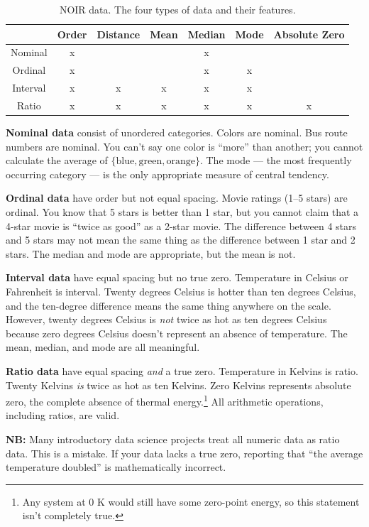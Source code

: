 \begin{table}
    \centering
    \begin{tabular}{c|cccccc}
         & Order & Distance & Mean & Median & Mode & Absolute Zero \\ \hline
        Nominal & x &  &  & x & & \\
        Ordinal & x &  &  & x & x & \\
        Interval & x & x & x & x & x & \\
        Ratio & x & x & x & x & x & x\\
    \end{tabular}
    \caption{NOIR data. The four types of data and their features.}
    \label{tab:noir}
\end{table}

\textbf{Nominal data} consist of unordered categories. Colors are nominal. Bus route numbers are nominal. You can't say one color is ``more'' than another; you cannot calculate the average of $\{\text{blue}, \text{green}, \text{orange}\}$. The mode --- the most frequently occurring category --- is the only appropriate measure of central tendency.

\textbf{Ordinal data} have order but not equal spacing. Movie ratings (1–5 stars) are ordinal. You know that 5 stars is better than 1 star, but you cannot claim that a 4-star movie is ``twice as good'' as a 2-star movie. The difference between 4 stars and 5 stars may not mean the same thing as the difference between 1 star and 2 stars. The median and mode are appropriate, but the mean is not.

\textbf{Interval data} have equal spacing but no true zero. Temperature in Celsius or Fahrenheit is interval. Twenty degrees Celsius is hotter than ten degrees Celsius, and the ten-degree difference means the same thing anywhere on the scale. However, twenty degrees Celsius is \textit{not} twice as hot as ten degrees Celsius because zero degrees Celsius doesn't represent an absence of temperature. The mean, median, and mode are all meaningful.

\textbf{Ratio data} have equal spacing \textit{and} a true zero. Temperature in Kelvins is ratio. Twenty Kelvins \textit{is} twice as hot as ten Kelvins. Zero Kelvins represents absolute zero, the complete absence of thermal energy.\footnote{Any system at $0\text{ K}$ would still have some zero-point energy, so this statement isn't completely true.} All arithmetic operations, including ratios, are valid.

\noindent \textbf{NB:} Many introductory data science projects treat all numeric data as ratio data. This is a mistake. If your data lacks a true zero, reporting that ``the average temperature doubled'' is mathematically incorrect.

